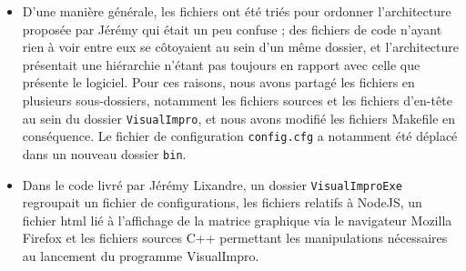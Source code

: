 \begin{itemize}
        \item D'une manière générale, les fichiers ont été triés pour
          ordonner l'architecture proposée par Jérémy qui était un peu
          confuse ; des fichiers de code n'ayant rien à voir entre eux
          se côtoyaient au sein d'un même dossier, et l'architecture
          présentait une hiérarchie n'étant pas toujours en rapport
          avec celle que présente le logiciel. Pour ces raisons, nous
          avons partagé les fichiers en plusieurs sous-dossiers,
          notamment les fichiers sources et les fichiers d'en-tête au
          sein du dossier \verb!VisualImpro!, et nous avons modifié
          les fichiers Makefile en conséquence. Le fichier de
          configuration \verb!config.cfg! a notamment été déplacé dans
          un nouveau dossier \verb!bin!.

          \item Dans le code livré par Jérémy Lixandre, un dossier
            \verb!VisualImproExe! regroupait un fichier de
            configurations, les fichiers relatifs à NodeJS, un fichier
            html lié à l'affichage de la matrice graphique via le
            navigateur Mozilla Firefox et les fichiers sources C++
            permettant les manipulations nécessaires au lancement du
            programme VisualImpro.
\end{itemize}
